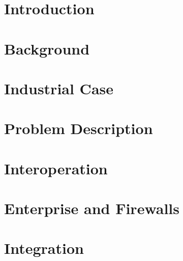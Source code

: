 \chapter{Introduction}


\chapter{Background}


%

%

\chapter{Industrial Case}
%

\chapter{Problem Description}
%


\chapter{Interoperation}


\chapter{Enterprise and Firewalls}


\chapter{Integration}


